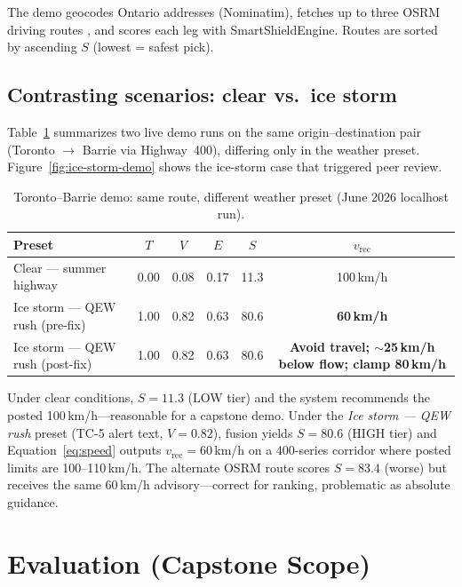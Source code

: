\documentclass[11pt,a4paper]{article}
\begin{document}
The demo geocodes Ontario addresses (Nominatim), fetches up to three OSRM driving routes \citep{osrm,openstreetmap}, and scores each leg with SmartShieldEngine. Routes are sorted by ascending $S$ (lowest = safest pick).

\subsection{Contrasting scenarios: clear vs.\ ice storm}

Table~\ref{tab:toronto-barrie} summarizes two live demo runs on the same origin--destination pair (Toronto $\rightarrow$ Barrie via Highway~400), differing only in the weather preset. Figure~\ref{fig:ice-storm-demo} shows the ice-storm case that triggered peer review.

\begin{table}[ht]
  \centering
  \caption{Toronto--Barrie demo: same route, different weather preset (June 2026 localhost run).}
  \label{tab:toronto-barrie}
  \small
  \begin{tabular}{@{}lccccc@{}}
    \toprule
    Preset & $T$ & $V$ & $E$ & $S$ & $v_{\text{rec}}$ \\
    \midrule
    Clear --- summer highway & 0.00 & 0.08 & 0.17 & 11.3 & 100\,km/h \\
    Ice storm --- QEW rush (pre-fix) & 1.00 & 0.82 & 0.63 & 80.6 & \textbf{60\,km/h} \\
    Ice storm --- QEW rush (post-fix) & 1.00 & 0.82 & 0.63 & 80.6 & \textbf{Avoid travel; $\sim$25\,km/h below flow; clamp 80\,km/h} \\
    \bottomrule
  \end{tabular}
\end{table}

Under clear conditions, $S=11.3$ (LOW tier) and the system recommends the posted 100\,km/h---reasonable for a capstone demo. Under the \emph{Ice storm --- QEW rush} preset (TC-5 alert text, $V=0.82$), fusion yields $S=80.6$ (HIGH tier) and Equation~\eqref{eq:speed} outputs $v_{\text{rec}}=60$\,km/h on a 400-series corridor where posted limits are 100--110\,km/h. The alternate OSRM route scores $S=83.4$ (worse) but receives the same 60\,km/h advisory---correct for ranking, problematic as absolute guidance.

\section{Evaluation (Capstone Scope)}
\label{sec:eval}
\end{document}
